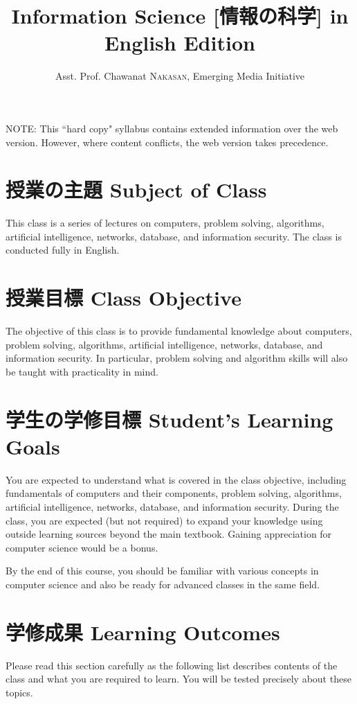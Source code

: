 \documentclass[a4paper]{article}
\title{Information Science [情報の科学] in English \newline
2021 Edition}
\author{Asst. Prof. Chawanat \textsc{Nakasan}, Emerging Media Initiative}
\date{}
\begin{document}
\maketitle

\noindent
NOTE: This ``hard copy" syllabus contains extended information over the web version. However, where content conflicts, the web version takes precedence.

\section{授業の主題 Subject of Class}
This class is a series of lectures on computers, problem solving, algorithms, artificial intelligence, networks, database, and information security.
The class is conducted fully in English.

\section{授業目標 Class Objective}
The objective of this class is to provide fundamental knowledge about computers, problem solving, algorithms, artificial intelligence, networks, database, and information security.
In particular, problem solving and algorithm skills will also be taught with practicality in mind.

\section{学生の学修目標 Student's Learning Goals}
You are expected to understand what is covered in the class objective, including fundamentals of computers and their components, problem solving, algorithms, artificial intelligence, networks, database, and information security. During the class, you are expected (but not required) to expand your knowledge using outside learning sources beyond the main textbook. Gaining appreciation for computer science would be a bonus.

By the end of this course, you should be familiar with various concepts in computer science and also be ready for advanced classes in the same field.

\section{学修成果 Learning Outcomes}
\label{goals}
Please read this section carefully as the following list describes contents of the class and what you are required to learn. You will be tested precisely about these topics.
\end{document}
